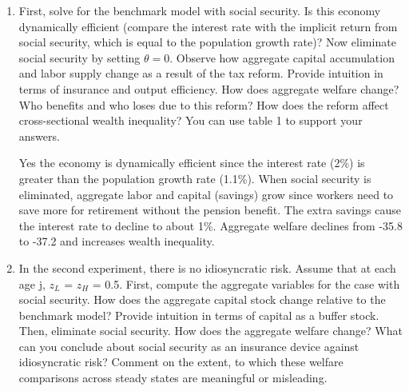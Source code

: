 \documentclass[12pt]{article}
\begin{document}
\begin{enumerate}
    \item First, solve for the benchmark model with social security. Is this economy dynamically efficient (compare the interest rate with the implicit return from social security, which is equal to the population growth rate)? Now eliminate social security by setting $\theta = 0$. Observe how aggregate capital accumulation and labor supply change as a result of the tax reform. Provide intuition in terms of insurance and output efficiency. How does aggregate welfare change? Who benefits and who loses due to this reform? How does the reform affect cross-sectional wealth inequality? You can use table 1 to support your answers.

    Yes the economy is dynamically efficient since the interest rate (2\%) is greater than the population growth rate (1.1\%). When social security is eliminated, aggregate labor and capital (savings) grow since workers need to save more for retirement without the pension benefit. The extra savings cause the interest rate to decline to about 1\%. Aggregate welfare declines from -35.8 to -37.2 and increases wealth inequality. 

    
    \item In the second experiment, there is no idiosyncratic risk. Assume that at each age j, $z_L$ = $z_H$ = 0.5. First, compute the aggregate variables for the case with social security. How does the aggregate capital stock change relative to the benchmark model? Provide intuition in terms of capital as a buffer stock. Then, eliminate social security. How does the aggregate welfare change? What can you conclude about social security as an insurance device against idiosyncratic risk? Comment on the extent, to which these welfare comparisons across steady states are meaningful or misleading.


\end{enumerate}
\end{document}
